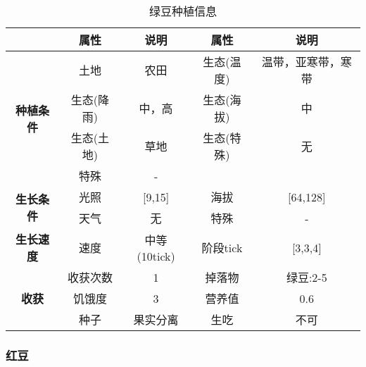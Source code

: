 \begin{table}[H]
    \centering
    \caption{绿豆种植信息}
    \label{table:绿豆种植信息}
    \setlength{\tabcolsep}{4mm}
    \begin{tabular}{c|cc|cc}
        \toprule
                                           & \textbf{属性} & \textbf{说明}   & \textbf{属性} & \textbf{说明} \\
        \midrule
        \multirow{4}{*}{\textbf{种植条件}} & 土地          & 农田            & 生态(温度)    & 温带，亚寒带，寒带    \\
                                           & 生态(降雨)    & 中，高          & 生态(海拔)    & 中            \\
                                           & 生态(土地)    & 草地            & 生态(特殊)    & 无            \\
                                           & 特殊          & -                                 \\
        \midrule
        \multirow{2}{*}{\textbf{生长条件}} & 光照          & [9,15]         & 海拔          & [64,128]      \\
                                           & 天气          & 无              & 特殊          & -      \\
        \midrule
        \textbf{生长速度}                  & 速度          & 中等(10tick)       & 阶段tick      & [3,3,4]       \\
        \midrule
        \multirow{3}{*}{\textbf{收获}}     & 收获次数      & 1               & 掉落物        & 绿豆:2-5      \\
                                           & 饥饿度        & 3               & 营养值        & 0.6           \\
                                           & 种子          & 果实分离        & 生吃          & 不可          \\
        \bottomrule
    \end{tabular}
\end{table}

\subsubsection{红豆}

